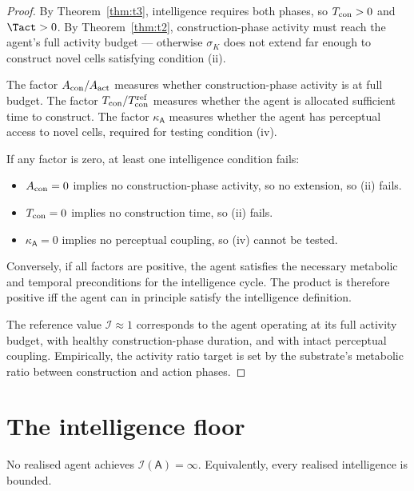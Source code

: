 \documentclass[11pt,twocolumn,a4paper]{article}
\newcommand{\agent}{\mathsf{A}}
\newcommand{\Iindex}{\mathcal{I}}
\newcommand{\Acon}{A_{\rm con}}
\newcommand{\Aact}{A_{\rm act}}
\newcommand{\Tcon}{T_{\rm con}}
\begin{document}
\begin{proof}
By Theorem~\ref{thm:t3}, intelligence requires both phases, so $\Tcon > 0$ and
$\Tact > 0$. By Theorem~\ref{thm:t2}, construction-phase activity must reach the agent's
full activity budget --- otherwise $\sigma_K$ does not extend far enough to construct
novel cells satisfying condition (ii).

The factor $\Acon / \Aact$ measures whether construction-phase activity is at full
budget. The factor $\Tcon / \Tcon^{\rm ref}$ measures whether the agent is allocated
sufficient time to construct. The factor $\kappa_\agent$ measures whether the agent has
perceptual access to novel cells, required for testing condition (iv).

If any factor is zero, at least one intelligence condition fails:
\begin{itemize}[leftmargin=*]
\item $\Acon = 0$ implies no construction-phase activity, so no extension, so (ii) fails.
\item $\Tcon = 0$ implies no construction time, so (ii) fails.
\item $\kappa_\agent = 0$ implies no perceptual coupling, so (iv) cannot be tested.
\end{itemize}
Conversely, if all factors are positive, the agent satisfies the necessary metabolic and
temporal preconditions for the intelligence cycle. The product is therefore positive iff
the agent can in principle satisfy the intelligence definition.

The reference value $\Iindex \approx 1$ corresponds to the agent operating at its full
activity budget, with healthy construction-phase duration, and with intact perceptual
coupling. Empirically, the activity ratio target is set by the substrate's metabolic
ratio between construction and action phases.
\end{proof}

\section{The intelligence floor}
\label{sec:floor}

\begin{theorem}\label{thm:t6}
No realised agent achieves $\Iindex(\agent) = \infty$. Equivalently, every realised
intelligence is bounded.
\end{theorem}
\end{document}
